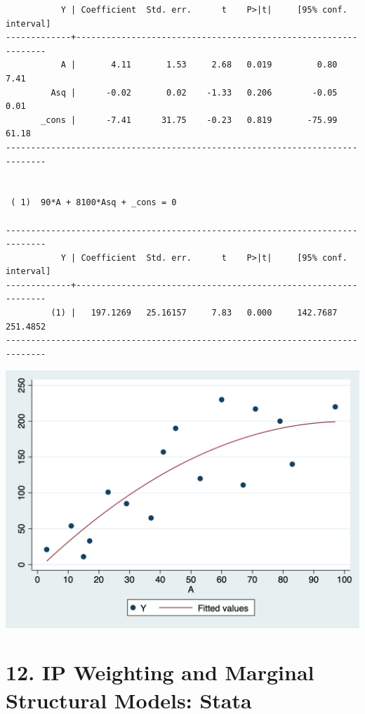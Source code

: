 \documentclass[
  10pt,
]{book}
\begin{document}
\begin{verbatim}
           Y | Coefficient  Std. err.      t    P>|t|     [95% conf. interval]
-------------+----------------------------------------------------------------
           A |       4.11       1.53     2.68   0.019         0.80        7.41
         Asq |      -0.02       0.02    -1.33   0.206        -0.05        0.01
       _cons |      -7.41      31.75    -0.23   0.819       -75.99       61.18
------------------------------------------------------------------------------


 ( 1)  90*A + 8100*Asq + _cons = 0

------------------------------------------------------------------------------
           Y | Coefficient  Std. err.      t    P>|t|     [95% conf. interval]
-------------+----------------------------------------------------------------
         (1) |   197.1269   25.16157     7.83   0.000     142.7687    251.4852
------------------------------------------------------------------------------
\end{verbatim}

\begin{center}\includegraphics[width=0.85\linewidth]{figs/stata-fig-11-5} \end{center}

\hypertarget{ip-weighting-and-marginal-structural-models-stata}{%
\chapter*{12. IP Weighting and Marginal Structural Models: Stata}\label{ip-weighting-and-marginal-structural-models-stata}}
\end{document}
